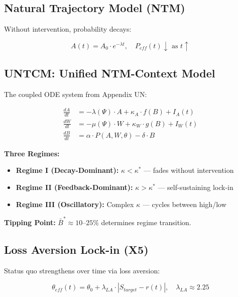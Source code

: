 \subsection{Natural Trajectory Model (NTM)}

Without intervention, probability decays:

\begin{equation}
A(t) = A_0 \cdot e^{-\lambda t}, \quad P_{eff}(t) \downarrow \text{ as } t \uparrow
\label{eq:mp-ntm-decay}
\end{equation}

\subsection{UNTCM: Unified NTM-Context Model}

The coupled ODE system from Appendix UN:

\begin{align}
\frac{dA}{dt} &= -\lambda(\Psi) \cdot A + \kappa_A \cdot f(B) + I_A(t) \\
\frac{dW}{dt} &= -\mu(\Psi) \cdot W + \kappa_W \cdot g(B) + I_W(t) \\
\frac{dB}{dt} &= \alpha \cdot P(A, W, \theta) - \delta \cdot B
\end{align}

\textbf{Three Regimes:}
\begin{itemize}[nosep]
\item \textbf{Regime I (Decay-Dominant):} $\kappa < \kappa^*$ --- fades without intervention
\item \textbf{Regime II (Feedback-Dominant):} $\kappa > \kappa^*$ --- self-sustaining lock-in
\item \textbf{Regime III (Oscillatory):} Complex $\kappa$ --- cycles between high/low
\end{itemize}

\textbf{Tipping Point:} $\bar{B}^* \approx 10$--$25\%$ determines regime transition.

\subsection{Loss Aversion Lock-in (X5)}

Status quo strengthens over time via loss aversion:

\begin{equation}
\theta_{eff}(t) = \theta_0 + \lambda_{LA} \cdot |S_{target} - r(t)|, \quad \lambda_{LA} \approx 2.25
\label{eq:mp-loss-aversion-lockin}
\end{equation}

